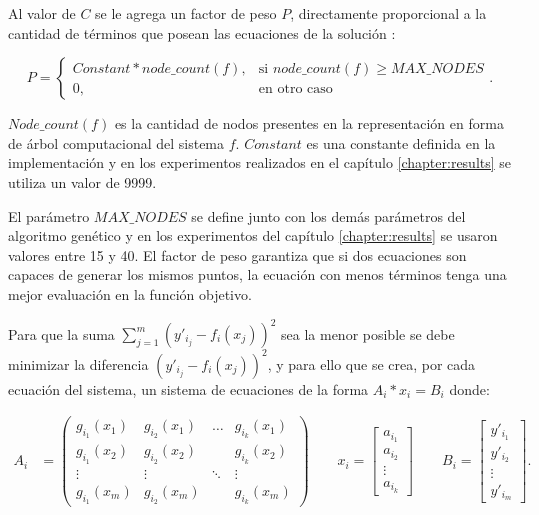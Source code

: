 Al valor de $C$ se le agrega un factor de peso $P$, directamente proporcional a la cantidad de términos que posean las ecuaciones de la solución \cite{gplearnbloat}:

$$P = \begin{cases}
        Constant * node\_count(f), & \text{si } node\_count(f) \geq MAX\_NODES \\
        0,                         & \text{en otro caso}
    \end{cases}.$$

$Node\_count(f)$ es la cantidad de nodos presentes en la representación en forma de árbol computacional del sistema $f$. $Constant$ es una constante definida en la implementación y en los experimentos realizados en el capítulo \ref{chapter:results} se utiliza un valor de 9999.

El parámetro $MAX\_NODES$ se define junto con los demás parámetros del algoritmo genético y en los experimentos del capítulo \ref{chapter:results} se usaron valores entre 15 y 40. El factor de peso garantiza que si dos ecuaciones son capaces de generar los mismos puntos, la ecuación con menos términos tenga una mejor evaluación en la función objetivo.

Para que la suma $\sum_{j=1}^{m}(y'_{i_j} - f_i(x_j)) ^ 2$ sea la menor posible se debe minimizar la diferencia $(y'_{i_j} - f_i(x_j))^2$, y para ello que se crea, por cada ecuación del sistema, un sistema de ecuaciones de la forma $A_i * x_i = B_i$ donde:

\begin{align*}
    A_i & = \begin{pmatrix}
        g_{i_1}(x_1) & g_{i_2}(x_1) & \dots  & g_{i_k}(x_1) \\
        g_{i_1}(x_2) & g_{i_2}(x_2) &        & g_{i_k}(x_2) \\
        \vdots       & \vdots       & \ddots & \vdots       \\
        g_{i_1}(x_m) & g_{i_2}(x_m) &        & g_{i_k}(x_m)
    \end{pmatrix}
    \qquad
    x_i = \begin{bmatrix}
        a_{i_1} \\
        a_{i_2} \\
        \vdots  \\
        a_{i_k}
    \end{bmatrix}
    \qquad
    B_i = \begin{bmatrix}
        y'_{i_1} \\
        y'_{i_2} \\
        \vdots   \\
        y'_{i_m}
    \end{bmatrix}.
\end{align*}

